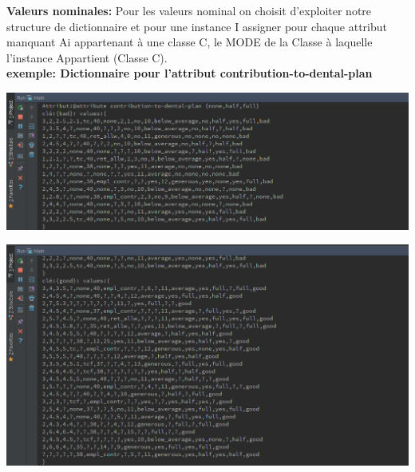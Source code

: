 \documentclass[12pt,a4paper,oneside]{book}
\begin{document}
\textbf{Valeurs nominales:}
Pour les valeurs nominal on choisit d'exploiter notre structure de dictionnaire et pour une instance I assigner pour chaque attribut manquant Ai appartenant à une classe C, le MODE de la Classe à laquelle l'instance Appartient (Classe C).\\

\textbf{exemple: Dictionnaire pour l'attribut contribution-to-dental-plan}
\begin{center}
	\includegraphics[width=1\textwidth]{screens/dicnominal1.png}%
	\label{labelname}%
\end{center}


\begin{center}
	\includegraphics[width=1\textwidth]{screens/dicnominal.png}%
	\label{labelname}%
\end{center}

 
\end{document}

